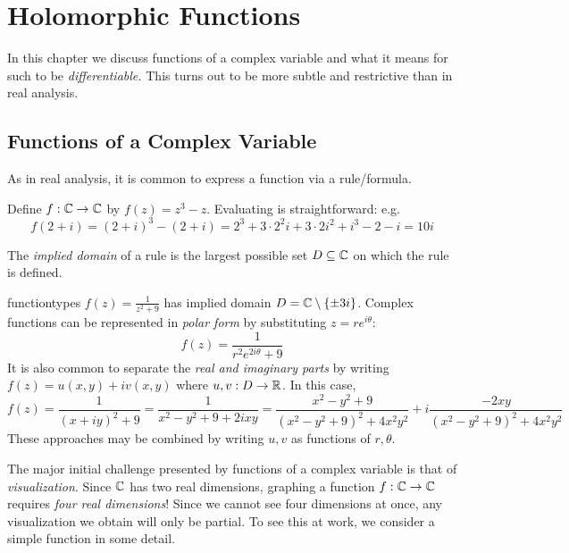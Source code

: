\graphicspath{{2holom/asy/}}


\section{Holomorphic Functions}\label{chap:holom}

In this chapter we discuss functions of a complex variable and what it means for such to be \emph{differentiable.} This turns out to be more subtle and restrictive than in real analysis.

\subsection{Functions of a Complex Variable}\label{sec:func}%

As in real analysis, it is common to express a function via a rule/formula.

\begin{example}{}{}
	Define $f:\mathbb{C}\to\mathbb{C}$ by $f(z)=z^3-z$. Evaluating is straightforward: e.g.
	\[
		f(2+i) =(2+i)^3-(2+i) =2^3+3\cdot 2^2i+3\cdot 2i^2+i^3-2-i=10i
	\]
\end{example}

The \emph{implied domain} of a rule is the largest possible set $D\subseteq \mathbb{C}$ on which the rule is defined.

\begin{example}{}{functiontypes}
	$f(z)=\frac 1{z^2+9}$ has implied domain $D=\mathbb{C}\setminus\{\pm 3i\}$. Complex functions can be represented in \emph{polar form} by substituting $z=re^{i\theta}$:
	\[
		f(z)=\frac 1{r^2e^{2i\theta}+9}
	\]
	It is also common to separate the \emph{real and imaginary parts} by writing $f(z)=u(x,y)+iv(x,y)$ where $u,v:D\to\mathbb{R}$. In this case,
	\[
		f(z) =\frac 1{(x+iy)^2+9} =\frac 1{x^2-y^2+9+2ixy} =\frac{x^2-y^2+9}{(x^2-y^2+9)^2+4x^2y^2} +i \frac{-2xy}{(x^2-y^2+9)^2+4x^2y^2}
	\]
	These approaches may be combined by writing $u,v$ as functions of $r,\theta$.
\end{example}

The major initial challenge presented by functions of a complex variable is that of \emph{visualization}. Since $\mathbb{C}$ has two real dimensions, graphing a function $f:\mathbb{C}\to\mathbb{C}$ requires \emph{four real dimensions}! Since we cannot see four dimensions at once, any visualization we obtain will only be partial. To see this at work, we consider a simple function in some detail.

